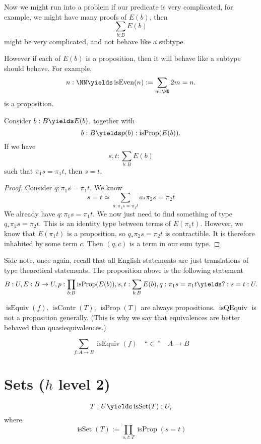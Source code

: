 \documentclass{article}
\newcommand\pred[1]{\operatorname{#1}}
\newcommand\isEquiv{\pred{isEquiv}}
\newcommand\isContr{\pred{isContr}}
\newcommand\isProp{\pred{isProp}}
\newcommand\isSet{\pred{isSet}}
\begin{document}
Now we might run into a problem if our predicate is very
complicated, for example, we might have many proofs of 
$E(b)$, then 
\[\sum_{b:B} E(b)\]
might be very complicated, and not behave like a subtype.

However if each of $E(b)$ is a proposition, then it will 
behave like a subtype should behave.
For example, 
\[n:\NN \yields \pred{isEven}(n) := \sum_{m:\NN} 2m=n .\]
is a proposition.

\begin{proposition}
Consider $b:B\yields E(b)$, together with 
\[b:B\yields p(b) : \isProp(E(b)).\]
If we have 
\[s,t:\sum_{b:B} E(b) \]
such that $\pi_1s=\pi_1t$, then $s=t$.
\end{proposition}

\begin{proof}
    Consider $q:\pi_1s=\pi_1t$. We know 
    \[ s=t
    \simeq
    \sum_{a:\pi_1s=\pi_1t} a_*\pi_2s = \pi_2t
    \]
    We already have $q:\pi_1s=\pi_1t$. We now just need 
    to find something of type $q_*\pi_2s=\pi_2t$.
    This is an identity type between terms of $E(\pi_1t)$.
    However, we know that $E(\pi_1t)$ is a proposition, so 
    $q_*\pi_2s=\pi_2t$ is contractible. It is therefore inhabited
    by some term $c$. Then $(q,c)$ is a term in our sum type.
\end{proof}

Side note, once again, recall that all English statements are 
just translations of type theoretical statements.
The proposition above is the following statement
\[ B:U,
E:B\to U,
p:\prod_{b:B} \isProp(E(b)),
s,t:\sum_{b:B} E(b),
q:\pi_1s=\pi_1t
\yields ?:s=t :U.
\]

\begin{proposition}
    $\isEquiv(f)$, $\isContr(T)$, $\isProp(T)$ are always 
    propositions.
    $\pred{isQEquiv}$ is not a proposition generally. (This is 
    why we say that equivalences are better behaved than 
    quasiequivalences.)
\end{proposition}

\begin{example}
    \[\sum_{f:A\to B} \isEquiv(f) \quad \text{``}\subset\text{''}\quad A\to B\]
\end{example}

\section{Sets ($h$ level 2)}

\begin{definition}
    \[T:U \yields \isSet(T):U,\]
    where 
    \[\isSet(T) := \prod_{s,t:T} \isProp(s=t) \]
\end{definition}
\end{document}
